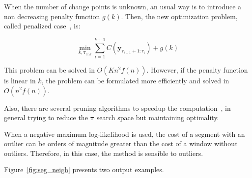 When the number of change points is unknown, an usual way is to introduce a non
decreasing penalty function $g(k)$. Then, the new optimization problem, called
penalized case~\cite{on_optimal_multiple_changepoint_algorithms_for_large_data},
is:

\begin{equation}
    \min_{k, \boldsymbol \tau_{1 : k}} \sum \limits_{i = 1}^{k + 1} C(\mathbf{y}_{\tau_{i - 1} + 1 : \tau_{i}}) + g(k)
\end{equation}

This problem can be solved in $O(K n^{2} f(n))$. However, if the penalty
function is linear in $k$, the problem can be formulated more efficiently and
solved in $O(n^{2} f(n))$.

Also, there are several pruning algorithms to speedup the
computation~\cite{optimal_detection_of_changepoints_with_a_linear_computational_cost, on_optimal_multiple_changepoint_algorithms_for_large_data, computationally_efficient_changepoint_detection_for_a_range_of_penalties},
in general trying to reduce the $\boldsymbol \tau$ search space but maintaining
optimality.

When a negative maximum log-likelihood is
used, the cost of a segment with an outlier can be orders of magnitude greater
than the cost of a window without outliers. Therefore,
in this case, the method is sensible to outliers.

Figure~\ref{fig:seg_neigh} presents two output examples.

